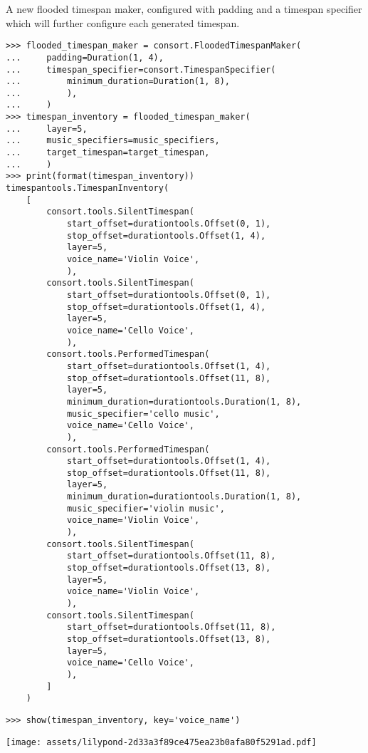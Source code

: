 A new flooded timespan maker, configured with padding and a timespan specifier
which will further configure each generated timespan.

\begin{comment}
<abjad>
flooded_timespan_maker = consort.FloodedTimespanMaker(
    padding=Duration(1, 4),
    timespan_specifier=consort.TimespanSpecifier(
        minimum_duration=Duration(1, 8),
        ),
    )
timespan_inventory = flooded_timespan_maker(
    layer=5,
    music_specifiers=music_specifiers,
    target_timespan=target_timespan,
    )
print(format(timespan_inventory))
show(timespan_inventory, key='voice_name')
</abjad>
\end{comment}

\begin{singlespacing}
\vspace{-0.5\baselineskip}
\begin{lstlisting}
>>> flooded_timespan_maker = consort.FloodedTimespanMaker(
...     padding=Duration(1, 4),
...     timespan_specifier=consort.TimespanSpecifier(
...         minimum_duration=Duration(1, 8),
...         ),
...     )
>>> timespan_inventory = flooded_timespan_maker(
...     layer=5,
...     music_specifiers=music_specifiers,
...     target_timespan=target_timespan,
...     )
>>> print(format(timespan_inventory))
timespantools.TimespanInventory(
    [
        consort.tools.SilentTimespan(
            start_offset=durationtools.Offset(0, 1),
            stop_offset=durationtools.Offset(1, 4),
            layer=5,
            voice_name='Violin Voice',
            ),
        consort.tools.SilentTimespan(
            start_offset=durationtools.Offset(0, 1),
            stop_offset=durationtools.Offset(1, 4),
            layer=5,
            voice_name='Cello Voice',
            ),
        consort.tools.PerformedTimespan(
            start_offset=durationtools.Offset(1, 4),
            stop_offset=durationtools.Offset(11, 8),
            layer=5,
            minimum_duration=durationtools.Duration(1, 8),
            music_specifier='cello music',
            voice_name='Cello Voice',
            ),
        consort.tools.PerformedTimespan(
            start_offset=durationtools.Offset(1, 4),
            stop_offset=durationtools.Offset(11, 8),
            layer=5,
            minimum_duration=durationtools.Duration(1, 8),
            music_specifier='violin music',
            voice_name='Violin Voice',
            ),
        consort.tools.SilentTimespan(
            start_offset=durationtools.Offset(11, 8),
            stop_offset=durationtools.Offset(13, 8),
            layer=5,
            voice_name='Violin Voice',
            ),
        consort.tools.SilentTimespan(
            start_offset=durationtools.Offset(11, 8),
            stop_offset=durationtools.Offset(13, 8),
            layer=5,
            voice_name='Cello Voice',
            ),
        ]
    )
\end{lstlisting}
\begin{lstlisting}
>>> show(timespan_inventory, key='voice_name')
\end{lstlisting}
\noindent\texttt{[image: assets/lilypond-2d33a3f89ce475ea23b0afa80f5291ad.pdf]}
\end{singlespacing}

